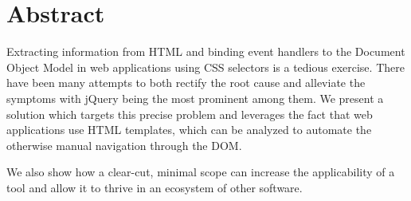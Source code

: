 \documentclass[thesis.tex]{subfiles}
\begin{document}
\chapter*{Abstract}
\label{chap:abstract}

Extracting information from HTML and binding event handlers to the
Document Object Model in web applications using CSS selectors is a tedious
exercise. There have been many attempts to both rectify the root cause and
alleviate the symptoms with jQuery being the most prominent among them.
We present a solution which targets this precise problem and leverages the fact
that web applications use HTML templates, which can be analyzed to automate
the otherwise manual navigation through the DOM.

We also show how a clear-cut, minimal scope can increase the applicability of
a tool and allow it to thrive in an ecosystem of other software.

\end{document}
